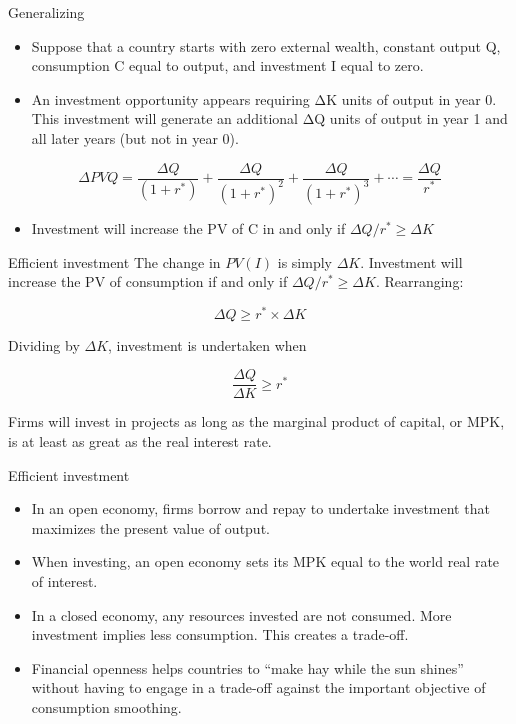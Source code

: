 \documentclass[
  ignorenonframetext,
]{beamer}
\providecommand{\tightlist}{%
  \setlength{\itemsep}{0pt}\setlength{\parskip}{0pt}}\usepackage{longtable,booktabs,array}
\begin{document}
\begin{frame}{Generalizing}
\label{generalizing-1}
\begin{itemize}
\tightlist
\item
  Suppose that a country starts with zero external wealth, constant
  output Q, consumption C equal to output, and investment I equal to
  zero.
\item
  An investment opportunity appears requiring ΔK units of output in year
  0. This investment will generate an additional ΔQ units of output in
  year 1 and all later years (but not in year 0).
\end{itemize}

\[
\Delta PVQ=\frac{\Delta Q}{(1+r^*)}+\frac{\Delta Q}{(1+r^*)^2}+\frac{\Delta Q}{(1+r^*)^3}+\cdots=\frac{\Delta Q}{r^*}
\]

\begin{itemize}
\tightlist
\item
  Investment will increase the PV of C in and only if
  \(\Delta Q/r^* \geq \Delta K\)
\end{itemize}
\end{frame}

\begin{frame}{Efficient investment}
\label{efficient-investment-4}
The change in \(PV(I)\) is simply \(\Delta K\). Investment will increase
the PV of consumption if and only if \(\Delta Q/r^* \geq \Delta K\).
Rearranging:

\[
\Delta Q \geq r^* \times \Delta K
\]

Dividing by \(\Delta K\), investment is undertaken when

\[
\frac{\Delta Q}{\Delta K} \geq r^*
\]

Firms will invest in projects as long as the marginal product of
capital, or MPK, is at least as great as the real interest rate.
\end{frame}

\begin{frame}{Efficient investment}
\label{efficient-investment-5}
\begin{itemize}
\item
  In an open economy, firms borrow and repay to undertake investment
  that maximizes the present value of output.
\item
  When investing, an open economy sets its MPK equal to the world real
  rate of interest.
\item
  In a closed economy, any resources invested are not consumed. More
  investment implies less consumption. This creates a trade-off.
\item
  Financial openness helps countries to ``make hay while the sun
  shines'' without having to engage in a trade-off against the important
  objective of consumption smoothing.
\end{itemize}
\end{frame}
\end{document}

